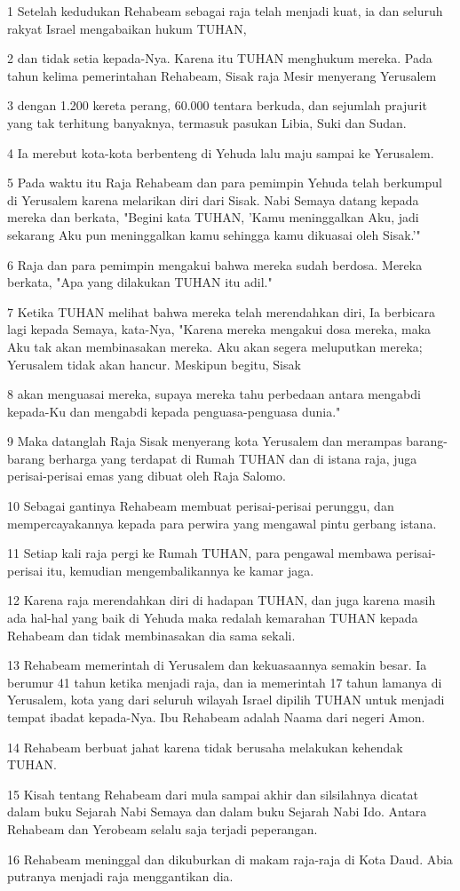 \par 1 Setelah kedudukan Rehabeam sebagai raja telah menjadi kuat, ia dan seluruh rakyat Israel mengabaikan hukum TUHAN,
\par 2 dan tidak setia kepada-Nya. Karena itu TUHAN menghukum mereka. Pada tahun kelima pemerintahan Rehabeam, Sisak raja Mesir menyerang Yerusalem
\par 3 dengan 1.200 kereta perang, 60.000 tentara berkuda, dan sejumlah prajurit yang tak terhitung banyaknya, termasuk pasukan Libia, Suki dan Sudan.
\par 4 Ia merebut kota-kota berbenteng di Yehuda lalu maju sampai ke Yerusalem.
\par 5 Pada waktu itu Raja Rehabeam dan para pemimpin Yehuda telah berkumpul di Yerusalem karena melarikan diri dari Sisak. Nabi Semaya datang kepada mereka dan berkata, "Begini kata TUHAN, 'Kamu meninggalkan Aku, jadi sekarang Aku pun meninggalkan kamu sehingga kamu dikuasai oleh Sisak.'"
\par 6 Raja dan para pemimpin mengakui bahwa mereka sudah berdosa. Mereka berkata, "Apa yang dilakukan TUHAN itu adil."
\par 7 Ketika TUHAN melihat bahwa mereka telah merendahkan diri, Ia berbicara lagi kepada Semaya, kata-Nya, "Karena mereka mengakui dosa mereka, maka Aku tak akan membinasakan mereka. Aku akan segera meluputkan mereka; Yerusalem tidak akan hancur. Meskipun begitu, Sisak
\par 8 akan menguasai mereka, supaya mereka tahu perbedaan antara mengabdi kepada-Ku dan mengabdi kepada penguasa-penguasa dunia."
\par 9 Maka datanglah Raja Sisak menyerang kota Yerusalem dan merampas barang-barang berharga yang terdapat di Rumah TUHAN dan di istana raja, juga perisai-perisai emas yang dibuat oleh Raja Salomo.
\par 10 Sebagai gantinya Rehabeam membuat perisai-perisai perunggu, dan mempercayakannya kepada para perwira yang mengawal pintu gerbang istana.
\par 11 Setiap kali raja pergi ke Rumah TUHAN, para pengawal membawa perisai-perisai itu, kemudian mengembalikannya ke kamar jaga.
\par 12 Karena raja merendahkan diri di hadapan TUHAN, dan juga karena masih ada hal-hal yang baik di Yehuda maka redalah kemarahan TUHAN kepada Rehabeam dan tidak membinasakan dia sama sekali.
\par 13 Rehabeam memerintah di Yerusalem dan kekuasaannya semakin besar. Ia berumur 41 tahun ketika menjadi raja, dan ia memerintah 17 tahun lamanya di Yerusalem, kota yang dari seluruh wilayah Israel dipilih TUHAN untuk menjadi tempat ibadat kepada-Nya. Ibu Rehabeam adalah Naama dari negeri Amon.
\par 14 Rehabeam berbuat jahat karena tidak berusaha melakukan kehendak TUHAN.
\par 15 Kisah tentang Rehabeam dari mula sampai akhir dan silsilahnya dicatat dalam buku Sejarah Nabi Semaya dan dalam buku Sejarah Nabi Ido. Antara Rehabeam dan Yerobeam selalu saja terjadi peperangan.
\par 16 Rehabeam meninggal dan dikuburkan di makam raja-raja di Kota Daud. Abia putranya menjadi raja menggantikan dia.

